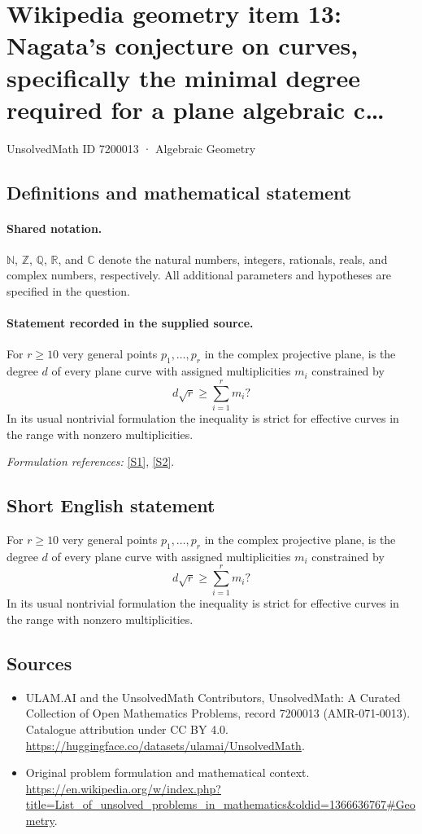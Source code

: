 \documentclass[11pt]{article}
\newcommand{\sref}[2]{\hyperlink{source:#1:#2}{[S#2]}}
\begin{document}
\setcounter{section}{7200012}
\section{Wikipedia geometry item 13: Nagata's conjecture on curves, specifically the minimal degree required for a plane algebraic c…}\label{7200013}
{\small UnsolvedMath ID 7200013 · Algebraic Geometry}
\subsection{Definitions and mathematical statement}

\paragraph{Shared notation.}$\mathbb N$, $\mathbb Z$, $\mathbb Q$, $\mathbb R$, and $\mathbb C$ denote the natural numbers, integers, rationals, reals, and complex numbers, respectively. All additional parameters and hypotheses are specified in the question.


\paragraph{Statement recorded in the supplied source.}
For $r\geq10$ very general points $p_1,\ldots,p_r$ in the complex projective plane, is the degree $d$ of every plane curve with assigned multiplicities $m_i$ constrained by
\[d\sqrt r\geq\sum_{i=1}^rm_i?\]
In its usual nontrivial formulation the inequality is strict for effective curves in the range with nonzero multiplicities.
\par\smallskip\textit{Formulation references:} \sref{7200013}{1}, \sref{7200013}{2}.
\subsection{Short English statement}
For $r\geq10$ very general points $p_1,\ldots,p_r$ in the complex projective plane, is the degree $d$ of every plane curve with assigned multiplicities $m_i$ constrained by
\[d\sqrt r\geq\sum_{i=1}^rm_i?\]
In its usual nontrivial formulation the inequality is strict for effective curves in the range with nonzero multiplicities.
\subsection{Sources}
\begin{itemize}
\item[\hypertarget{source:7200013:1}{S1}] ULAM.AI and the UnsolvedMath Contributors, UnsolvedMath: A Curated Collection of Open Mathematics Problems, record 7200013 (AMR-071-0013). Catalogue attribution under CC BY 4.0.
\url{https://huggingface.co/datasets/ulamai/UnsolvedMath}.
\item[\hypertarget{source:7200013:2}{S2}] Original problem formulation and mathematical context.
\url{https://en.wikipedia.org/w/index.php?title=List_of_unsolved_problems_in_mathematics&oldid=1366636767#Geometry}.
\end{itemize}
\label{end:7200013}
\end{document}
